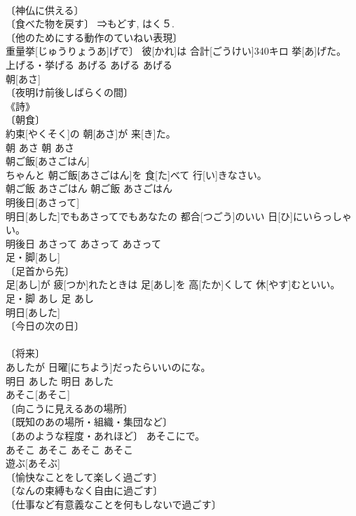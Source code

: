 \documentclass[8pt]{extreport}
\begin{document}
\begin{CJK}{UTF8}{min}
\\	〔神仏に供える〕 
\\	〔食べた物を戻す〕 ⇒もどす, はく５. 
\\	〔他のためにする動作のていねい表現〕	
\\	重量挙[じゅうりょうあ]げで〕 彼[かれ]は 合計[ごうけい]340キロ 挙[あ]げた。	
\\	上げる・挙げる	あげる	あげる	あげる	
\\	朝[あさ]	
\\	〔夜明け前後しばらくの間〕 
\\	《詩》 
\\	〔朝食〕 
\\	約束[やくそく]の 朝[あさ]が 来[き]た。	
\\	朝	あさ	朝	あさ	
\\	朝ご飯[あさごはん]	
\\	ちゃんと 朝ご飯[あさごはん]を 食[た]べて 行[い]きなさい。	
\\	朝ご飯	あさごはん	朝ご飯	あさごはん	
\\	明後日[あさって]	
\\	明日[あした]でもあさってでもあなたの 都合[つごう]のいい 日[ひ]にいらっしゃい。	
\\	明後日	あさって	あさって	あさって	
\\	足・脚[あし]	
\\	〔足首から先〕 
\\	足[あし]が 疲[つか]れたときは 足[あし]を 高[たか]くして 休[やす]むといい。	
\\	足・脚	あし	足	あし	
\\	明日[あした]	
\\	〔今日の次の日〕 
\\	[＝あす] 
\\	〔将来〕 
\\	[＝あす]	あしたが 日曜[にちよう]だったらいいのにな。	
\\	明日	あした	明日	あした	
\\	あそこ[あそこ]	
\\	〔向こうに見えるあの場所〕 
\\	〔既知のあの場所・組織・集団など〕 
\\	〔あのような程度・あれほど〕	あそこに{で}。	
\\	あそこ	あそこ	あそこ	あそこ	
\\	遊ぶ[あそぶ]	
\\	〔愉快なことをして楽しく過ごす〕 
\\	〔なんの束縛もなく自由に過ごす〕 
\\	〔仕事など有意義なことを何もしないで過ごす〕 

\end{CJK}
\end{document}
